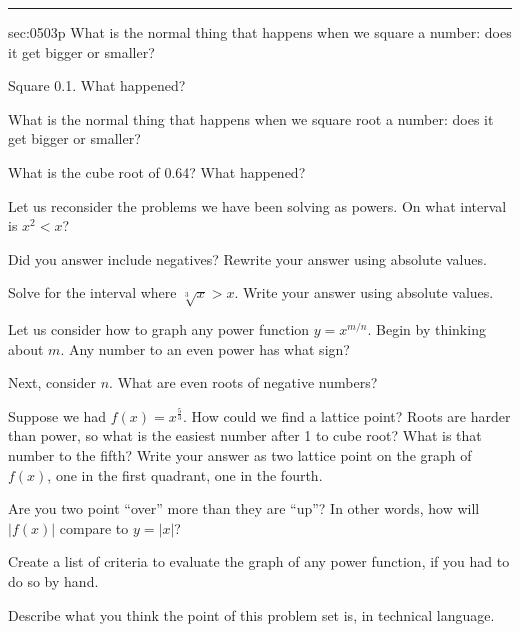\renewcommand{\columnseprule}{1.5pt}
\begin{multicols*}{2}
\rule[0.5\baselineskip]{0.4\textwidth}{1pt}
\noindent
{}\label{sec:0503p}
\begin{exercises}{sec:0503p}
\lab{} What is the normal thing that happens when we square a number: does it get bigger or smaller?

\vspace{2cm}
\lab{} Square 0.1.  What happened?

\vspace{2cm}
\lab{} What is the normal thing that happens when we square root a number: does it get bigger or smaller?


\vspace{2cm}
\lab{} What is the cube root of 0.64?  What happened?

\vspace{2cm}
\lab{} Let us reconsider the problems we have been solving as powers.  On what interval is $x^2 < x$?  

\vspace{2cm}
\lab{} Did you answer include negatives?  Rewrite your answer using absolute values.

\vspace{3cm}
\lab{} Solve for the interval where $\sqrt[3]{x} > x$.  Write your answer using absolute values.

\vspace{2cm}
\lab{} Let us consider how to graph any power function $y= x^{m/n}$.  Begin by thinking about $m$.  Any number to an even power has what sign?

\vspace{2cm}
\lab{} Next, consider $n$.  What are even roots of negative numbers?

\vspace{2cm}
\lab{} Suppose we had $f(x)=x^{\frac{5}{3}}$.  How could we find a lattice point?  Roots are harder than power, so what is the easiest number after 1 to cube root?  What is that number to the fifth?  Write your answer as two lattice point on the graph of $f(x)$, one in the first quadrant, one in the fourth.

\vspace{2cm}
\lab{} Are you two point ``over'' more than they are ``up''?  In other words, how will $|f(x)|$ compare to $y=|x|$?

\vspace{2cm}
\lab{} Create a list of criteria to evaluate the graph of any power function, if you had to do so by hand.

\vspace{2cm}
\lab{} Describe what you think the point of this problem set is, in technical language.


\end{exercises}
\end{multicols*}